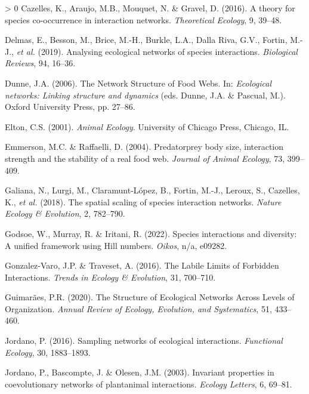 \documentclass[11pt]{article}
\newlength{\cslhangindent}
\newenvironment{CSLReferences}[3] %
 {%
  \setlength{\parindent}{0pt}
  \ifodd #1 \everypar{\setlength{\hangindent}{\cslhangindent}}\ignorespaces\fi
  \ifnum #2 > 0
  \setlength{\parskip}{#2\baselineskip}
  \fi
 }%
 {}
\begin{document}
\begin{CSLReferences}{1}{0}
\leavevmode\hypertarget{ref-Cazelles2016Theorya}{}%
Cazelles, K., Araujo, M.B., Mouquet, N. \& Gravel, D. (2016). A theory
for species co-occurrence in interaction networks. \emph{Theoretical
Ecology}, 9, 39--48.

\leavevmode\hypertarget{ref-Delmas2019Analysing}{}%
Delmas, E., Besson, M., Brice, M.-H., Burkle, L.A., Dalla Riva, G.V.,
Fortin, M.-J., \emph{et al.} (2019). Analysing ecological networks of
species interactions. \emph{Biological Reviews}, 94, 16--36.

\leavevmode\hypertarget{ref-Dunne2006Network}{}%
Dunne, J.A. (2006). The Network Structure of Food Webs. In:
\emph{Ecological networks: Linking structure and dynamics} (eds. Dunne,
J.A. \& Pascual, M.). Oxford University Press, pp. 27--86.

\leavevmode\hypertarget{ref-Elton2001Animal}{}%
Elton, C.S. (2001). \emph{Animal Ecology}. University of Chicago Press,
Chicago, IL.

\leavevmode\hypertarget{ref-Emmerson2004PrePre}{}%
Emmerson, M.C. \& Raffaelli, D. (2004). Predatorprey body size,
interaction strength and the stability of a real food web. \emph{Journal
of Animal Ecology}, 73, 399--409.

\leavevmode\hypertarget{ref-Galiana2018SpaSca}{}%
Galiana, N., Lurgi, M., Claramunt-López, B., Fortin, M.-J., Leroux, S.,
Cazelles, K., \emph{et al.} (2018). The spatial scaling of species
interaction networks. \emph{Nature Ecology \& Evolution}, 2, 782--790.

\leavevmode\hypertarget{ref-Godsoe2022Species}{}%
Godsoe, W., Murray, R. \& Iritani, R. (2022). Species interactions and
diversity: A unified framework using Hill numbers. \emph{Oikos}, n/a,
e09282.

\leavevmode\hypertarget{ref-Gonzalez-Varo2016Labilea}{}%
Gonzalez-Varo, J.P. \& Traveset, A. (2016). The Labile Limits of
Forbidden Interactions. \emph{Trends in Ecology \& Evolution}, 31,
700--710.

\leavevmode\hypertarget{ref-Guimaraes2020Structurea}{}%
Guimarães, P.R. (2020). The Structure of Ecological Networks Across
Levels of Organization. \emph{Annual Review of Ecology, Evolution, and
Systematics}, 51, 433--460.

\leavevmode\hypertarget{ref-Jordano2016SamNet}{}%
Jordano, P. (2016). Sampling networks of ecological interactions.
\emph{Functional Ecology}, 30, 1883--1893.

\leavevmode\hypertarget{ref-Jordano2003Invarianta}{}%
Jordano, P., Bascompte, J. \& Olesen, J.M. (2003). Invariant properties
in coevolutionary networks of plantanimal interactions. \emph{Ecology
Letters}, 6, 69--81.


\end{CSLReferences}
\end{document}
